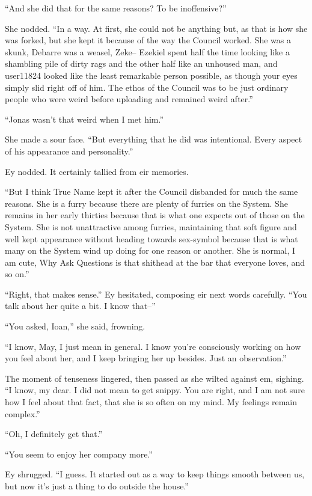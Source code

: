 ``And she did that for the same reasons? To be inoffensive?''

She nodded. ``In a way. At first, she could not be anything but, as that is how she was forked, but she kept it because of the way the Council worked. She was a skunk, Debarre was a weasel, Zeke-- Ezekiel spent half the time looking like a shambling pile of dirty rags and the other half like an unhoused man, and user11824 looked like the least remarkable person possible, as though your eyes simply slid right off of him. The ethos of the Council was to be just ordinary people who were weird before uploading and remained weird after.''

``Jonas wasn't that weird when I met him.''

She made a sour face. ``But everything that he did was intentional. Every aspect of his appearance and personality.''

Ey nodded. It certainly tallied from eir memories.

``But I think True Name kept it after the Council disbanded for much the same reasons. She is a furry because there are plenty of furries on the System. She remains in her early thirties because that is what one expects out of those on the System. She is not unattractive among furries, maintaining that soft figure and well kept appearance without heading towards sex-symbol because that is what many on the System wind up doing for one reason or another. She is normal, I am cute, Why Ask Questions is that shithead at the bar that everyone loves, and so on.''

``Right, that makes sense.'' Ey hesitated, composing eir next words carefully. ``You talk about her quite a bit. I know that--''

``You asked, Ioan,'' she said, frowning.

``I know, May, I just mean in general. I know you're consciously working on how you feel about her, and I keep bringing her up besides. Just an observation.''

The moment of tenseness lingered, then passed as she wilted against em, sighing. ``I know, my dear. I did not mean to get snippy. You are right, and I am not sure how I feel about that fact, that she is so often on my mind. My feelings remain complex.''

``Oh, I definitely get that.''

``You seem to enjoy her company more.''

Ey shrugged. ``I guess. It started out as a way to keep things smooth between us, but now it's just a thing to do outside the house.''

